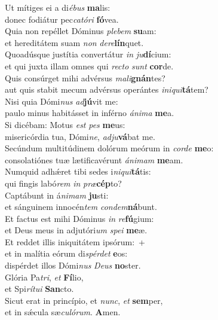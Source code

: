 \oddverse Ut mítiges ei a di\textit{é}\textit{bus} \textbf{ma}lis:~\*\\
\oddverse donec fodiátur pec\textit{ca}\textit{tó}\textit{ri} \textbf{fó}vea.\\
\evenverse Quia non repéllet Dóminus \textit{ple}\textit{bem} \textbf{su}am:~\*\\
\evenverse et hereditátem suam \textit{non} \textit{de}\textit{re}\textbf{lín}quet.\\
\oddverse Quoadúsque justítia convertátur \textit{in} \textit{ju}\textbf{dí}cium:~\*\\
\oddverse et qui juxta illam omnes qui \textit{re}\textit{cto} \textit{sunt} \textbf{cor}de.\\
\evenverse Quis consúrget mihi advérsus \textit{ma}\textit{li}\textbf{gnán}tes?~\*\\
\evenverse aut quis stabit mecum advérsus operántes \textit{i}\textit{ni}\textit{qui}\textbf{tá}tem?\\
\oddverse Nisi quia Dómi\textit{nus} \textit{ad}\textbf{jú}vit me:~\*\\
\oddverse paulo minus habitásset in inférno \textit{á}\textit{ni}\textit{ma} \textbf{me}a.\\
\evenverse Si dicébam: Motus \textit{est} \textit{pes} \textbf{me}us:~\*\\
\evenverse misericórdia tua, Dómi\textit{ne}, \textit{ad}\textit{ju}\textbf{vá}bat me.\\
\oddverse Secúndum multitúdinem dolórum meórum in \textit{cor}\textit{de} \textbf{me}o:~\*\\
\oddverse consolatiónes tuæ lætificavérunt \textit{á}\textit{ni}\textit{mam} \textbf{me}am.\\
\evenverse Numquid adhǽret tibi sedes i\textit{ni}\textit{qui}\textbf{tá}tis:~\*\\
\evenverse qui fingis labó\textit{rem} \textit{in} \textit{præ}\textbf{cép}to?\\
\oddverse Captábunt in á\textit{ni}\textit{mam} \textbf{ju}sti:~\*\\
\oddverse et sánguinem innocén\textit{tem} \textit{con}\textit{dem}\textbf{ná}bunt.\\
\evenverse Et factus est mihi Dóminus \textit{in} \textit{re}\textbf{fú}gium:~\*\\
\evenverse et Deus meus in adjutóri\textit{um} \textit{spe}\textit{i} \textbf{me}æ.\\
\oddverse Et reddet illis iniquitátem ipsórum:~+\\
\oddverse  et in malítia eórum di\textit{spér}\textit{det} \textbf{e}os:~\*\\
\oddverse dispérdet illos Dómi\textit{nus} \textit{De}\textit{us} \textbf{no}ster.\\
\evenverse Glória Pa\textit{tri}, \textit{et} \textbf{Fí}lio,~\*\\
\evenverse et Spi\textit{rí}\textit{tu}\textit{i} \textbf{San}cto.\\
\oddverse Sicut erat in princípio, et \textit{nunc}, \textit{et} \textbf{sem}per,~\*\\
\oddverse et in sǽcula sæ\textit{cu}\textit{ló}\textit{rum}. \textbf{A}men.\\

